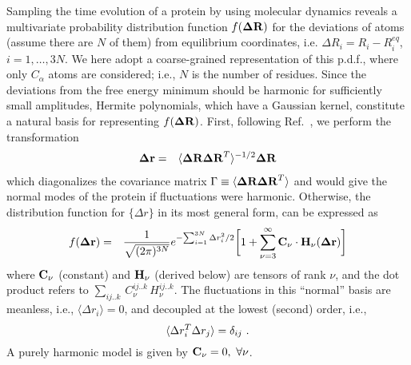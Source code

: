 \documentclass[prl,nofootinbib,twocolumn,floatfix,showpacs]{revtex4}
\begin{document}

Sampling the time evolution of a protein by using molecular dynamics
reveals a multivariate probability distribution function $f({\bf\Delta
  R})$ for the deviations of atoms (assume there are $N$ of them) from
equilibrium coordinates, i.e. $\Delta R_i = R_i - R_i^{eq}$,
$i=1,\dots,3N$. We here adopt a coarse-grained representation of this
p.d.f., where only $C_\alpha$ atoms are considered; i.e., $N$ is the
number of residues. Since the deviations from the free energy minimum
should be harmonic for sufficiently small amplitudes, Hermite
polynomials, which have a Gaussian kernel, constitute a natural basis
for representing $f({\bf\Delta R})$. First, following
Ref.~\cite{Yogurtcu}, we perform the transformation
\begin{eqnarray}
\label{eq:rotation}
{\bf \Delta r} &=& \langle {\bf\Delta R \Delta R}^T\rangle ^{-1/2} {\bf
  \Delta R}
\end{eqnarray}
which diagonalizes the covariance matrix $
\Gamma\equiv\langle {\bf\Delta R \Delta R}^T\rangle$  and would give the normal
modes of the protein if fluctuations were harmonic. Otherwise, the
distribution function for $\{\Delta r\}$ in its most general form, can
be expressed as~\cite{Flory}
\begin{eqnarray}
\label{hermite_expansion}
f({\bf\Delta r}) &=& \frac{1}{\sqrt{(2\pi)^{3N}}} e^{
    -{\sum_{i=1}^{3N} \Delta r_i^2}/2} \bigg[ 1 +  \sum_{\nu=3}^\infty
 {\bf C_\nu}\cdot {\bf H}_\nu({\bf \Delta r}) \bigg]
\end{eqnarray}
where ${\bf C}_\nu$ (constant) and ${\bf H}_\nu$ (derived below) are
tensors of rank $\nu$, and the dot product refers to
$\sum_{ij..k}\,C_\nu^{ij..k}\,H_\nu^{ij..k}$.  The fluctuations in
this ``normal'' basis are meanless, i.e., $\langle {\Delta r_i}\rangle
= 0$, and decoupled at the lowest (second) order, i.e.,
\begin{equation}
\langle {
\label{eqn:pair_corr}
  \Delta r_i^T \Delta r_j}\rangle = \delta_{ij}\ .
\end{equation}
A purely harmonic model is given by ${\bf C}_\nu = 0,\ \forall \nu$.
\end{document}
